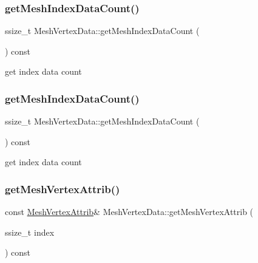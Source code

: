 \subsubsection{\texorpdfstring{get\+Mesh\+Index\+Data\+Count()}{getMeshIndexDataCount()}\hspace{0.1cm}{\footnotesize\ttfamily [1/2]}}
{\footnotesize\ttfamily ssize\+\_\+t Mesh\+Vertex\+Data\+::get\+Mesh\+Index\+Data\+Count (\begin{DoxyParamCaption}{ }\end{DoxyParamCaption}) const\hspace{0.3cm}{\ttfamily [inline]}}

get index data count \mbox{\label{classMeshVertexData_ab63dd57bce3efef6120b3678e69606e1}} 
\subsubsection{\texorpdfstring{get\+Mesh\+Index\+Data\+Count()}{getMeshIndexDataCount()}\hspace{0.1cm}{\footnotesize\ttfamily [2/2]}}
{\footnotesize\ttfamily ssize\+\_\+t Mesh\+Vertex\+Data\+::get\+Mesh\+Index\+Data\+Count (\begin{DoxyParamCaption}{ }\end{DoxyParamCaption}) const\hspace{0.3cm}{\ttfamily [inline]}}

get index data count \mbox{\label{classMeshVertexData_a6ada4b01fcfbd383989719fb4648e2fa}} 
\subsubsection{\texorpdfstring{get\+Mesh\+Vertex\+Attrib()}{getMeshVertexAttrib()}\hspace{0.1cm}{\footnotesize\ttfamily [1/2]}}
{\footnotesize\ttfamily const \hyperlink{structMeshVertexAttrib}{Mesh\+Vertex\+Attrib}\& Mesh\+Vertex\+Data\+::get\+Mesh\+Vertex\+Attrib (\begin{DoxyParamCaption}\item[{ssize\+\_\+t}]{index }\end{DoxyParamCaption}) const\hspace{0.3cm}{\ttfamily [inline]}}

